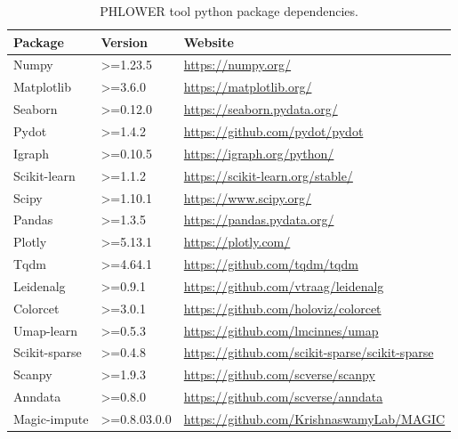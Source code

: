 \begin{table}[!ht]
	\centering
	\begin{tabular}{lll}
		\toprule
		\textbf{Package} & \textbf{Version} & \textbf{Website} \\
		\midrule
			Numpy& >=1.23.5 & \url{https://numpy.org/} \\
			Matplotlib& >=3.6.0 & \url{https://matplotlib.org/} \\
			Seaborn& >=0.12.0 & \url{https://seaborn.pydata.org/} \\
			Pydot& >=1.4.2 & \url{https://github.com/pydot/pydot} \\
			Igraph& >=0.10.5 & \url{https://igraph.org/python/} \\
			Scikit-learn& >=1.1.2 & \url{https://scikit-learn.org/stable/} \\
			Scipy& >=1.10.1 & \url{https://www.scipy.org/} \\
			Pandas& >=1.3.5 & \url{https://pandas.pydata.org/} \\
			Plotly& >=5.13.1 & \url{https://plotly.com/} \\
			Tqdm& >=4.64.1 & \url{https://github.com/tqdm/tqdm} \\
			Leidenalg& >=0.9.1 & \url{https://github.com/vtraag/leidenalg} \\
			Colorcet& >=3.0.1 & \url{https://github.com/holoviz/colorcet} \\
			Umap-learn& >=0.5.3 & \url{https://github.com/lmcinnes/umap} \\
			Scikit-sparse& >=0.4.8 & \url{https://github.com/scikit-sparse/scikit-sparse} \\
			Scanpy& >=1.9.3 & \url{https://github.com/scverse/scanpy} \\
			Anndata& >=0.8.0 & \url{https://github.com/scverse/anndata} \\
            Magic-impute & >=0.8.03.0.0 & \url{https://github.com/KrishnaswamyLab/MAGIC}\\
		\bottomrule
	\end{tabular}
	\vspace{0.1cm}
	\caption[PHLOWER tool python package dependencies]{PHLOWER tool python package dependencies.}
	\label{tab:phlower_python_dependencies}
\end{table}


